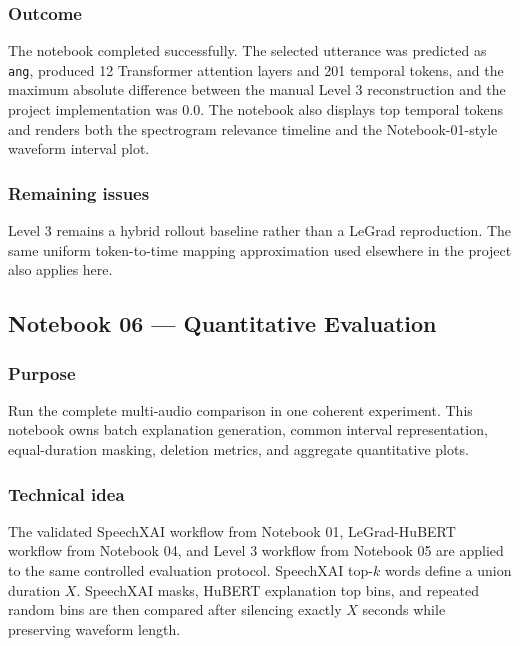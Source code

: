 \documentclass[11pt]{article}
\begin{document}
\subsubsection*{Outcome}
The notebook completed successfully. The selected utterance was predicted as
\texttt{ang}, produced 12 Transformer attention layers and 201 temporal tokens,
and the maximum absolute difference between the manual Level 3 reconstruction
and the project implementation was 0.0. The notebook also displays top temporal
tokens and renders both the spectrogram relevance timeline and the
Notebook-01-style waveform interval plot.

\subsubsection*{Remaining issues}
Level 3 remains a hybrid rollout baseline rather than a LeGrad reproduction.
The same uniform token-to-time mapping approximation used elsewhere in the
project also applies here.

\subsection{Notebook 06 --- Quantitative Evaluation}

\subsubsection*{Purpose}
Run the complete multi-audio comparison in one coherent experiment. This notebook owns batch explanation generation, common interval representation, equal-duration masking, deletion metrics, and aggregate quantitative plots.

\subsubsection*{Technical idea}
The validated SpeechXAI workflow from Notebook 01, LeGrad-HuBERT workflow from
Notebook 04, and Level 3 workflow from Notebook 05 are applied to the same
controlled evaluation protocol. SpeechXAI top-$k$ words define a union duration
\(X\). SpeechXAI masks, HuBERT explanation top bins, and repeated random bins
are then compared after silencing exactly \(X\) seconds while preserving
waveform length.
\end{document}
